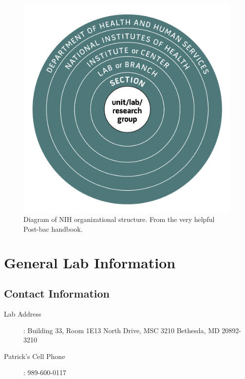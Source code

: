 \documentclass[10pt, letterpaper, twocolumn]{article} %
\begin{document}
\begin{figure}
	\includegraphics[width=\linewidth]{unitlab.png} %
	\caption{Diagram of NIH organizational structure. From the very helpful Post-bac handbook. \citep{}} %
	\label{unit_organization} %
\end{figure}

\section{General Lab Information}
\subsection{Contact Information}
\begin{description}
\item [Lab Address]: \newline Building 33, Room 1E13  North Drive, MSC 3210 \newline Bethesda, MD 20892-3210
\item [Patrick's Cell Phone]: 989-600-0117
\end{description}
\end{document}
